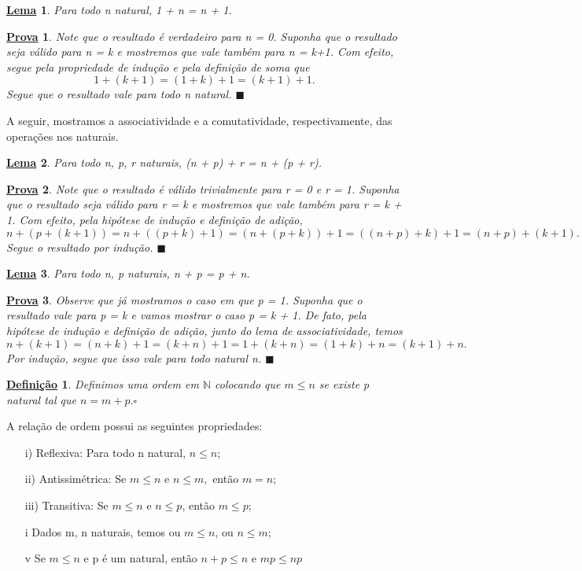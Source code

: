 \documentclass{article}
\newtheorem*{def*}{\underline{Defini\c c\~ao}}
\newtheorem*{lemma*}{\underline{Lema}}
\newtheorem*{proof*}{\underline{Prova}}
\renewcommand\qedsymbol{$\blacksquare$}
\begin{document}
\begin{lemma*}
  Para todo n natural, 1 + n = n + 1.
\end{lemma*}
\begin{proof*}
  Note que o resultado \'e verdadeiro para n = 0. Suponha que o resultado seja v\'alido para n = k e mostremos que 
vale tamb\'em para n = k+1. Com efeito, segue pela propriedade de indu\c c\~ao e pela defini\c c\~ao de soma que
 $$
    1 + (k + 1) = (1 + k) + 1 =  (k + 1) + 1. 
 $$
 Segue que o resultado vale para todo n natural. \qedsymbol
\end{proof*}
  A seguir, mostramos a associatividade e a comutatividade, respectivamente, das opera\c c\~oes nos naturais.
\begin{lemma*}
  Para todo n, p, r naturais, (n + p) + r = n + (p + r).
\end{lemma*}
\begin{proof*}
  Note que o resultado \'e v\'alido trivialmente para r = 0 e r = 1. Suponha que o resultado seja v\'alido para
r = k e mostremos que vale tamb\'em para r = k + 1. Com efeito, pela hip\'otese de indu\c c\~ao e defini\c c\~ao de adi\c c\~ao,
  $$
    n + (p + (k + 1)) = n + ((p + k) + 1) = (n + (p + k)) + 1 = ((n + p) + k) + 1 = (n + p) + (k + 1).
  $$
  Segue o resultado por indu\c c\~ao. \qedsymbol
\end{proof*}
\begin{lemma*}
  Para todo n, p naturais, n + p = p + n. 
\end{lemma*}
\begin{proof*}
  Observe que j\'a mostramos o caso em que p = 1. Suponha que o resultado vale para p = k e vamos mostrar o caso
p = k + 1. De fato, pela hip\'otese de indu\c c\~ao e defini\c c\~ao de adi\c c\~ao, junto do lema de associatividade,
temos  
  $$
    n + (k + 1) = (n + k) + 1 = (k + n) + 1 = 1 + (k + n) = (1 + k) + n = (k + 1) + n.
  $$
  Por indu\c c\~ao, segue que isso vale para todo natural n. \qedsymbol
\end{proof*}

\begin{def*}
  Definimos uma ordem em $\mathbb{N}$ colocando que $m\leq{n}$ se existe p natural tal que $n = m + p. \square$
\end{def*}
  A rela\c c\~ao de ordem possui as seguintes propriedades:
 \begin{itemize}
   \item[i)] Reflexiva: Para todo n natural, $n\leq{n};$
   \item[ii)] Antissim\'etrica: Se $m\leq n$ e $n\leq m,$ ent\~ao $m = n;$
   \item[iii)] Transitiva: Se $m \leq n$ e $n \leq p$, ent\~ao $m\leq p;$
   \item[i] Dados m, n naturais, temos ou $m \leq n$, ou $n \leq m;$
   \item[v] Se $m \leq n$ e p \'e um natural, ent\~ao $n + p\leq n\text{ e } mp\leq np$
 \end{itemize}
\end{document}
